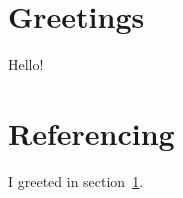 \section{Greetings}
\label{sec:greetings}

Hello!

\section{Referencing}

I greeted in section~\ref{sec:greetings}.